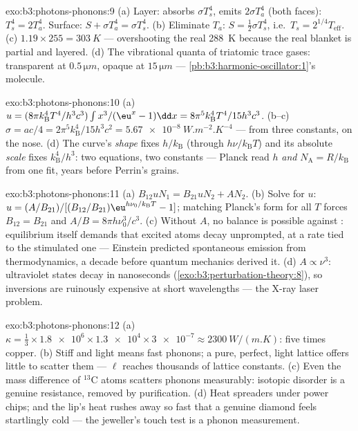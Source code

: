 \begin{solution}{exo:b3:photons-phonons:9}
(a) Layer: absorbs $\sigma T_s^4$, emits $2\sigma T_a^4$ (both
faces): $T_s^4 = 2T_a^4$. Surface: $S + \sigma T_a^4 = \sigma
T_s^4$. (b) Eliminate $T_a$: $S = \tfrac12\sigma T_s^4$, i.e.\
$T_s = 2^{1/4}T_{\text{eff}}$. (c) $1.19 \times 255 =
\qty{303}{K}$ --- overshooting the real \qty{288}{K} because the
real blanket is partial and layered. (d) The vibrational quanta
of triatomic trace gases: transparent at $0.5\,\unit{\micro m}$,
opaque at $15\,\unit{\micro m}$ ---
\cref{pb:b3:harmonic-oscillator:1}'s molecule.
\end{solution}

\begin{solution}{exo:b3:photons-phonons:10}
(a) $u = (8\pi k_{\text{B}}^4T^4/h^3c^3)\int x^3/(\eu^x - 1)\dd x
= 8\pi^5k_{\text{B}}^4T^4/15h^3c^3$. (b--c) $\sigma = ac/4 =
2\pi^5k_{\text{B}}^4/15h^3c^2 = \qty{5.67e-8}{W.m^{-2}.K^{-4}}$
--- from three constants, on the nose. (d) The curve's \emph{shape}
fixes $h/k_{\text{B}}$ (through $h\nu/k_{\text{B}}T$) and its
absolute \emph{scale} fixes $k_{\text{B}}^4/h^3$: two equations,
two constants --- Planck read $h$ \emph{and} $N_{\text{A}} =
R/k_{\text{B}}$ from one fit, years before Perrin's grains.
\end{solution}

\begin{solution}{exo:b3:photons-phonons:11}
(a) $B_{12}uN_1 = B_{21}uN_2 + AN_2$. (b) Solve for $u$:
$u = (A/B_{21})/[(B_{12}/B_{21})\eu^{h\nu_0/k_{\text{B}}T} - 1]$;
matching Planck's form for all $T$ forces $B_{12} = B_{21}$ and
$A/B = 8\pi h\nu_0^3/c^3$. (c) Without $A$, no balance is possible
against \omterm{thm:b3:photons-phonons:planck}{Planck's law}: equilibrium itself demands that excited
atoms decay unprompted, at a rate tied to the stimulated one ---
Einstein predicted spontaneous emission from thermodynamics, a
decade before quantum mechanics derived it. (d) $A \propto
\nu^3$: ultraviolet states decay in nanoseconds
(\cref{exo:b3:perturbation-theory:8}), so inversions are
ruinously expensive at short wavelengths --- the X-ray laser
problem.
\end{solution}

\begin{solution}{exo:b3:photons-phonons:12}
(a) $\kappa = \tfrac13 \times \num{1.8e6} \times \num{1.3e4}
\times \num{3e-7} \approx \qty{2300}{W/(m.K)}$: five times
copper. (b) Stiff and light means fast phonons; a pure, perfect,
light lattice offers little to scatter them --- $\ell$ reaches
thousands of lattice constants. (c) Even the mass difference of
$^{13}$C atoms scatters phonons measurably: isotopic disorder is
a genuine resistance, removed by purification. (d) Heat spreaders
under power chips; and the lip's heat rushes away so fast that a
genuine diamond feels startlingly cold --- the jeweller's touch
test is a phonon measurement.
\end{solution}

